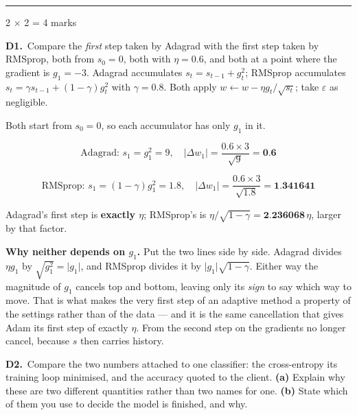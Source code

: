 \documentclass[10pt,a4paper]{article}
\newcommand{\parthead}[2]{\vspace{2pt}\noindent\rule{\linewidth}{0.4pt}\par\vspace{2pt}%
  \noindent{\bfseries Part #1}\hfill{\small #2}\par\vspace{1pt}}
\newcommand{\sol}[1]{\textbf{#1}}
\begin{document}
\newpage

\parthead{D --- Short answer}{2 $\times$ 2 = 4 marks}

\textbf{D1.}\ Compare the \emph{first} step taken by Adagrad with the first step taken by RMSprop, both from $s_0 = 0$, both with $\eta = 0.6$, and both at a point where the gradient is $g_1 = -3$. Adagrad accumulates $s_t = s_{t-1} + g_t^2$; RMSprop accumulates $s_t = \gamma s_{t-1} + (1-\gamma)g_t^2$ with $\gamma = 0.8$. Both apply $w \leftarrow w - \eta g_t/\sqrt{s_t}$; take $\varepsilon$ as negligible.

\vspace{2pt}

Both start from $s_0 = 0$, so each accumulator has only $g_1$ in it.

\[ \text{Adagrad: } s_1 = g_1^2 = 9, \quad \lvert \Delta w_1 \rvert = \frac{0.6 \times 3}{\sqrt{9}} = \sol{0.6} \]

\[ \text{RMSprop: } s_1 = (1-\gamma) g_1^2 = 1.8, \quad \lvert \Delta w_1 \rvert = \frac{0.6 \times 3}{\sqrt{1.8}} = \sol{1.341641} \]

Adagrad's first step is \sol{exactly $\eta$}; RMSprop's is $\eta/\sqrt{1-\gamma} = \sol{2.236068}\,\eta$, larger by that factor.

\vspace{2pt}

\textbf{Why neither depends on $g_1$.} Put the two lines side by side. Adagrad divides $\eta g_1$ by $\sqrt{g_1^2} = \lvert g_1 \rvert$, and RMSprop divides it by $\lvert g_1 \rvert \sqrt{1-\gamma}$. Either way the magnitude of $g_1$ cancels top and bottom, leaving only its \emph{sign} to say which way to move. That is what makes the very first step of an adaptive method a property of the settings rather than of the data --- and it is the same cancellation that gives Adam its first step of exactly $\eta$. From the second step on the gradients no longer cancel, because $s$ then carries history.

\vspace{6pt}

\textbf{D2.}\ Compare the two numbers attached to one classifier: the cross-entropy its training loop minimised, and the accuracy quoted to the client. \textbf{(a)} Explain why these are two different quantities rather than two names for one. \textbf{(b)} State which of them you use to decide the model is finished, and why.

\vspace{2pt}
\end{document}
